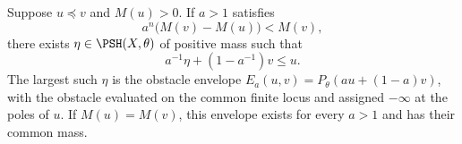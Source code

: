 \begin{theorem}\label{thm:positive-mass-extrapolation}
Suppose $u\preceq v$ and $M(u)>0$. If $a>1$ satisfies
\begin{equation}\label{eq:extrapolation-mass-margin}
 a^n\bigl(M(v)-M(u)\bigr)<M(v),
\end{equation}
there exists $\eta\in\PSH(X,\theta)$ of positive mass such that
\begin{equation}\label{eq:extrapolation-convex-inequality}
 a^{-1}\eta+(1-a^{-1})v\leq u.
\end{equation}
The largest such $\eta$ is the obstacle envelope
$E_a(u,v)=P_\theta(a u+(1-a)v)$, with the obstacle evaluated on the common finite locus and assigned $-\infty$ at the poles of $u$. If $M(u)=M(v)$, this envelope exists for every $a>1$ and has their common mass.
\end{theorem}
